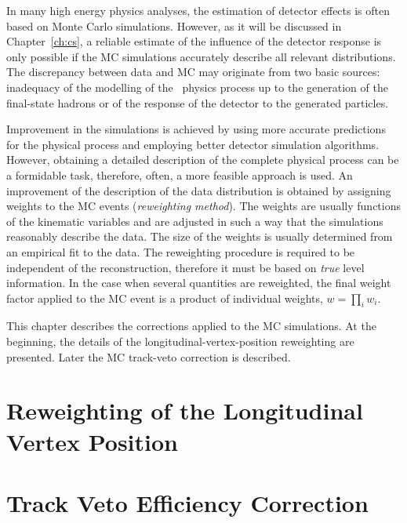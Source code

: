  In many high energy physics analyses, the estimation of detector effects is often based on Monte Carlo simulations. However, as it will be discussed in Chapter~\ref{ch:cs}, a reliable estimate of the influence of the detector response is only possible if the MC simulations accurately describe all relevant distributions. %
 The discrepancy between data and MC may originate from two basic sources: inadequacy of the modelling of the \ep~physics process up to the generation of the final-state hadrons or of the response of the detector to the generated particles.
 
Improvement in the simulations is achieved by using more accurate predictions for the physical process and employing better detector simulation algorithms. However, obtaining a detailed description of the complete physical process can be a formidable task, therefore, often, a more feasible approach is used. An improvement of the description of the data distribution is obtained by assigning weights to the MC events (\emph{reweighting method}). The weights are usually functions of the kinematic variables and are adjusted in such a way that the simulations reasonably describe the data. The size of the weights is usually determined from an empirical fit to the data. The reweighting procedure is required to be independent of the reconstruction, therefore it must be based on \emph{true} level information. In the case when several quantities are reweighted, the final weight factor applied to the MC event is a product of individual weights, $w = \prod_i w_i$.
 
 This chapter describes the corrections applied to the MC simulations. At the beginning, the details of the longitudinal-vertex-position reweighting are presented. Later the MC track-veto correction is described.

 \section{Reweighting of the Longitudinal Vertex Position}
 
 
 \section{Track Veto Efficiency Correction}
 


